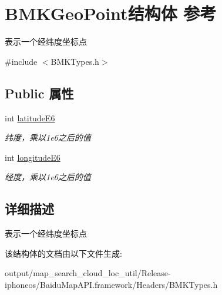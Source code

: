 \hypertarget{struct_b_m_k_geo_point}{}\section{B\+M\+K\+Geo\+Point结构体 参考}
\label{struct_b_m_k_geo_point}


表示一个经纬度坐标点  




{\ttfamily \#include $<$B\+M\+K\+Types.\+h$>$}

\subsection*{Public 属性}
\begin{DoxyCompactItemize}
\item 
\hypertarget{struct_b_m_k_geo_point_ad6f5b38335cff314e953e9b7eb5c7b39}{}int \hyperlink{struct_b_m_k_geo_point_ad6f5b38335cff314e953e9b7eb5c7b39}{latitude\+E6}\label{struct_b_m_k_geo_point_ad6f5b38335cff314e953e9b7eb5c7b39}

\begin{DoxyCompactList}\small\item\em 纬度，乘以1e6之后的值 \end{DoxyCompactList}\item 
\hypertarget{struct_b_m_k_geo_point_aac3f3dc0ae09785e5b70c319b68d4047}{}int \hyperlink{struct_b_m_k_geo_point_aac3f3dc0ae09785e5b70c319b68d4047}{longitude\+E6}\label{struct_b_m_k_geo_point_aac3f3dc0ae09785e5b70c319b68d4047}

\begin{DoxyCompactList}\small\item\em 经度，乘以1e6之后的值 \end{DoxyCompactList}\end{DoxyCompactItemize}


\subsection{详细描述}
表示一个经纬度坐标点 

该结构体的文档由以下文件生成\+:\begin{DoxyCompactItemize}
\item 
output/map\+\_\+search\+\_\+cloud\+\_\+loc\+\_\+util/\+Release-\/iphoneos/\+Baidu\+Map\+A\+P\+I.\+framework/\+Headers/B\+M\+K\+Types.\+h\end{DoxyCompactItemize}
